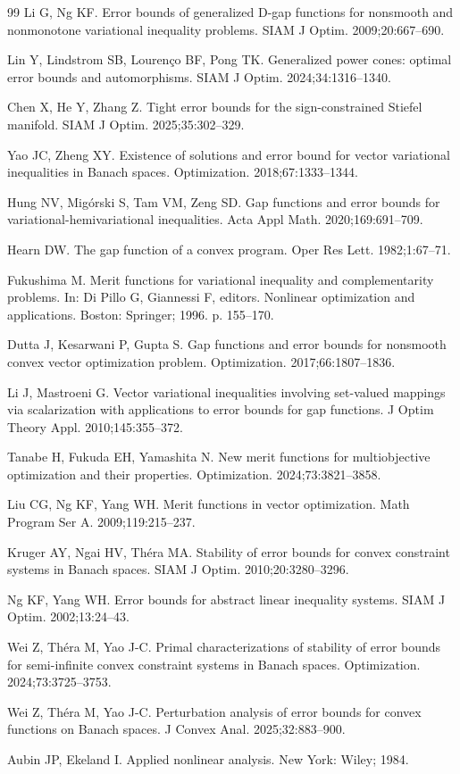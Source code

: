 \documentclass[11pt]{article}
\begin{document}
\begin{thebibliography}{99}
 Li G, Ng KF. Error bounds of generalized D-gap functions for nonsmooth and nonmonotone variational inequality problems. SIAM J Optim. 2009;20:667--690. 

 Lin Y, Lindstrom SB, Louren\c{c}o BF, Pong TK. Generalized power cones: optimal error bounds and automorphisms. SIAM J Optim. 2024;34:1316--1340.


  Chen X, He Y, Zhang Z. Tight error bounds for the sign-constrained Stiefel manifold. SIAM J Optim. 2025;35:302--329. 

 Yao JC, Zheng XY. Existence of solutions and error bound for vector variational inequalities in Banach spaces. Optimization. 2018;67:1333--1344. 


 Hung NV, Mig\'{o}rski S, Tam VM, Zeng SD. Gap functions and error bounds for variational-hemivariational inequalities. Acta Appl Math. 2020;169:691--709. 

 Hearn DW. The gap function of a convex program. Oper Res Lett. 1982;1:67--71. 


 Fukushima M. Merit functions for variational inequality and complementarity problems. In: Di Pillo G, Giannessi F, editors. Nonlinear optimization and applications. Boston: Springer; 1996. p. 155--170. 


 Dutta J, Kesarwani P, Gupta S. Gap functions and error bounds for nonsmooth convex vector optimization problem. Optimization. 2017;66:1807--1836. 


 Li J, Mastroeni G. Vector variational inequalities involving set-valued mappings via scalarization with applications to error bounds for gap functions. J Optim Theory Appl. 2010;145:355--372. 


 Tanabe H, Fukuda EH, Yamashita N. New merit functions for multiobjective optimization and their properties. Optimization. 2024;73:3821--3858. 


 Liu CG, Ng KF, Yang WH. Merit functions in vector optimization. Math Program Ser A. 2009;119:215--237. 


 Kruger AY, Ngai HV, Th\'{e}ra MA. Stability of error bounds for convex constraint systems in Banach spaces. SIAM J Optim. 2010;20:3280--3296. 


 Ng KF, Yang WH. Error bounds for abstract linear inequality systems. SIAM J Optim. 2002;13:24--43. 

 Wei Z, Th\'{e}ra M, Yao J-C. Primal characterizations of stability of error bounds for semi-infinite convex constraint systems in Banach spaces. Optimization. 2024;73:3725--3753. 


 Wei Z, Th\'{e}ra M, Yao J-C. Perturbation analysis of error bounds for convex functions on Banach spaces. J Convex Anal. 2025;32:883--900. 


 Aubin JP, Ekeland I. Applied nonlinear analysis. New York: Wiley; 1984.






\end{thebibliography}
\end{document}
